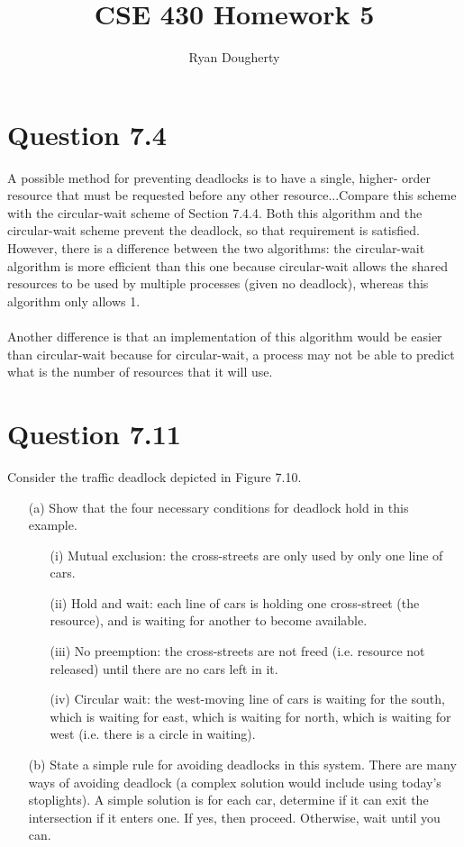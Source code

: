 \documentclass[12pt]{article}
\title{CSE 430 Homework 5}
\author{Ryan Dougherty}
\date{}                                           %
\begin{document}
\maketitle

\section*{Question 7.4} {\color{blue}A possible method for preventing deadlocks is to have a single, higher- order resource that must be requested before any other resource...Compare this scheme with the circular-wait scheme of Section 7.4.4.} Both this algorithm and the circular-wait scheme prevent the deadlock, so that requirement is satisfied. However, there is a difference between the two algorithms: the circular-wait algorithm is more efficient than this one because circular-wait allows the shared resources to be used by multiple processes (given no deadlock), whereas this algorithm only allows 1. 
\\ \\
Another difference is that an implementation of this algorithm would be easier than circular-wait because for circular-wait, a process may not be able to predict what is the number of resources that it will use.

\section*{Question 7.11} {\color{blue}Consider the traffic deadlock depicted in Figure 7.10.
\begin{enumerate}
\item[(a)]Show that the four necessary conditions for deadlock hold in this example. {\color{black}
\begin{itemize}
\item[(i)]Mutual exclusion: the cross-streets are only used by only one line of cars.
\item[(ii)]Hold and wait: each line of cars is holding one cross-street (the resource), and is waiting for another to become available.
\item[(iii)]No preemption: the cross-streets are not freed (i.e. resource not released) until there are no cars left in it.
\item[(iv)]Circular wait: the west-moving line of cars is waiting for the south, which is waiting for east, which is waiting for north, which is waiting for west (i.e. there is a circle in waiting).
\end{itemize}
}
\item[(b)]State a simple rule for avoiding deadlocks in this system. {\color{black} There are many ways of avoiding deadlock (a complex solution would include using today's stoplights). A simple solution is for each car, determine if it can exit the intersection if it enters one. If yes, then proceed. Otherwise, wait until you can.
}
\end{enumerate}
}
\end{document}
